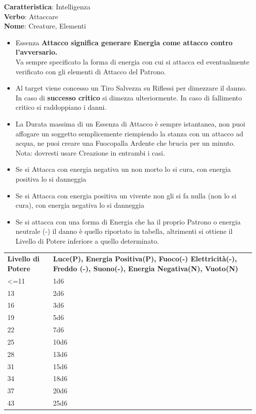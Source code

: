 \documentclass[a4paper,10 pt,twoside,openany]{book}
\begin{document}
\textbf{Caratteristica}: Intelligenza\\
\textbf{Verbo}: Attaccare\\
\textbf{Nome}: Creature, Elementi\\

\label{essenza-attacco---intelletto}
\begin{itemize}
	\item
	Essenza \textbf{Attacco significa generare Energia come attacco contro l'avversario.}\\
	Va sempre specificato la forma di energia con cui si attacca ed eventualmente verificato con gli elementi di Attacco del Patrono.
	\item
	Al target viene concesso un Tiro Salvezza su Riflessi per dimezzare il danno. In caso di \textbf{successo critico} si dimezza ulteriormente. In caso di fallimento critico si raddoppiano i danni.
	\item
	La Durata massima di un Essenza di Attacco è sempre istantanea, non puoi affogare un soggetto semplicemente riempiendo la stanza con un attacco ad acqua, ne puoi creare una Fuocopalla Ardente che brucia per un minuto.
	Nota: dovresti usare Creazione in entrambi i casi.
	\item
	Se si Attacca con energia negativa un non morto lo si cura, con energia positiva lo si danneggia
	\item
	Se si Attacca con energia positiva un vivente non gli si fa nulla (non lo si cura), con energia negativa lo si danneggia
	\item
	Se si attacca con una forma di Energia che ha il proprio Patrono o energia neutrale (-) il danno è quello riportato in tabella, altrimenti si ottiene il Livello di Potere inferiore a quello determinato.
\end{itemize}

\bigskip

\begin{tabularx}{0.95\textwidth}{lX}
	\toprule
	\textbf{Livello di Potere} & \textbf{Luce(P), Energia Positiva(P), Fuoco(-) Elettricità(-), Freddo (-), Suono(-), Energia Negativa(N), Vuoto(N)}\\
	<=11                       & 1d6\\
	13                         & 2d6\\
	16                         & 3d6\\
	19                         & 5d6\\
	22                         & 7d6\\
	25                         & 10d6\\
	28                         & 13d6\\
	31                         & 15d6\\
	34                         & 18d6\\
	37                         & 20d6\\
	43                         & 25d6\\
\end{tabularx}
\end{document}
